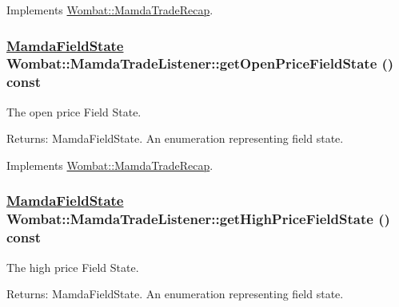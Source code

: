 Implements \hyperlink{classWombat_1_1MamdaTradeRecap_285abbfee630b27b7b20957f35250f19}{Wombat::Mamda\-Trade\-Recap}.\hypertarget{classWombat_1_1MamdaTradeListener_823d3caa4ea0c0c6efb7c6f0e7e2a59e}{
\subsubsection[getOpenPriceFieldState]{\setlength{\rightskip}{0pt plus 5cm}\hyperlink{namespaceWombat_93aac974f2ab713554fd12a1fa3b7d2a}{Mamda\-Field\-State} Wombat::Mamda\-Trade\-Listener::get\-Open\-Price\-Field\-State () const}}
\label{classWombat_1_1MamdaTradeListener_823d3caa4ea0c0c6efb7c6f0e7e2a59e}


The open price Field State. 

\begin{Desc}
\item[Returns:]Mamda\-Field\-State. An enumeration representing field state. \end{Desc}


Implements \hyperlink{classWombat_1_1MamdaTradeRecap_aa06d51b6f953dbef06a4d59a8438ec1}{Wombat::Mamda\-Trade\-Recap}.\hypertarget{classWombat_1_1MamdaTradeListener_2d9891182ae722a107f9b49dd5ecb559}{
\subsubsection[getHighPriceFieldState]{\setlength{\rightskip}{0pt plus 5cm}\hyperlink{namespaceWombat_93aac974f2ab713554fd12a1fa3b7d2a}{Mamda\-Field\-State} Wombat::Mamda\-Trade\-Listener::get\-High\-Price\-Field\-State () const}}
\label{classWombat_1_1MamdaTradeListener_2d9891182ae722a107f9b49dd5ecb559}


The high price Field State. 

\begin{Desc}
\item[Returns:]Mamda\-Field\-State. An enumeration representing field state. \end{Desc}


